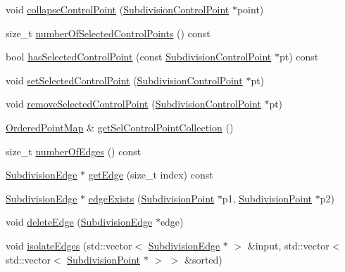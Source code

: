 \begin{DoxyCompactItemize}
\item 
void \hyperlink{classShipCAD_1_1SubdivisionSurface_a8a9682720550170236c353d011d06313}{collapse\+Control\+Point} (\hyperlink{classShipCAD_1_1SubdivisionControlPoint}{Subdivision\+Control\+Point} $\ast$point)
\item 
size\+\_\+t \hyperlink{classShipCAD_1_1SubdivisionSurface_a578aeb421311cb0f0080762b403577b6}{number\+Of\+Selected\+Control\+Points} () const 
\item 
bool \hyperlink{classShipCAD_1_1SubdivisionSurface_af9a8875e925bd0703dc6ca784b171141}{has\+Selected\+Control\+Point} (const \hyperlink{classShipCAD_1_1SubdivisionControlPoint}{Subdivision\+Control\+Point} $\ast$pt) const 
\item 
void \hyperlink{classShipCAD_1_1SubdivisionSurface_a65cc43d93da8ed72af631e893057c773}{set\+Selected\+Control\+Point} (\hyperlink{classShipCAD_1_1SubdivisionControlPoint}{Subdivision\+Control\+Point} $\ast$pt)
\item 
void \hyperlink{classShipCAD_1_1SubdivisionSurface_a5be891c06dc5e441511fbdb73d71efeb}{remove\+Selected\+Control\+Point} (\hyperlink{classShipCAD_1_1SubdivisionControlPoint}{Subdivision\+Control\+Point} $\ast$pt)
\item 
\hyperlink{classOrderedPointMap}{Ordered\+Point\+Map} \& \hyperlink{classShipCAD_1_1SubdivisionSurface_abf8b8f77097b24be87696d15273611bd}{get\+Sel\+Control\+Point\+Collection} ()
\item 
size\+\_\+t \hyperlink{classShipCAD_1_1SubdivisionSurface_aa6d04be5b9c112a9968c18b3363b8d4d}{number\+Of\+Edges} () const 
\item 
\hyperlink{classShipCAD_1_1SubdivisionEdge}{Subdivision\+Edge} $\ast$ \hyperlink{classShipCAD_1_1SubdivisionSurface_aff334a802f80635026fe8d88f925d314}{get\+Edge} (size\+\_\+t index) const 
\item 
\hyperlink{classShipCAD_1_1SubdivisionEdge}{Subdivision\+Edge} $\ast$ \hyperlink{classShipCAD_1_1SubdivisionSurface_adfdeabdc19eb55a7ba4ab0b607207300}{edge\+Exists} (\hyperlink{classShipCAD_1_1SubdivisionPoint}{Subdivision\+Point} $\ast$p1, \hyperlink{classShipCAD_1_1SubdivisionPoint}{Subdivision\+Point} $\ast$p2)
\item 
void \hyperlink{classShipCAD_1_1SubdivisionSurface_abb5beb9a6fc413e8d713e18fb39bf2ba}{delete\+Edge} (\hyperlink{classShipCAD_1_1SubdivisionEdge}{Subdivision\+Edge} $\ast$edge)
\item 
void \hyperlink{classShipCAD_1_1SubdivisionSurface_aaed537a17f41b3bec950509299725edf}{isolate\+Edges} (std\+::vector$<$ \hyperlink{classShipCAD_1_1SubdivisionEdge}{Subdivision\+Edge} $\ast$ $>$ \&input, std\+::vector$<$ std\+::vector$<$ \hyperlink{classShipCAD_1_1SubdivisionPoint}{Subdivision\+Point} $\ast$ $>$ $>$ \&sorted)

\end{DoxyCompactItemize}
